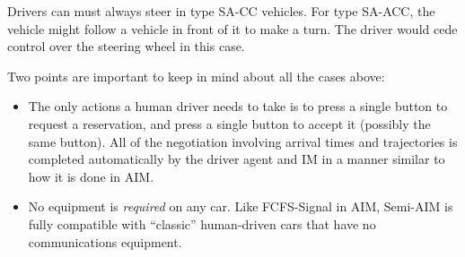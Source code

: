 Drivers can must always steer in type SA-CC vehicles. For type SA-ACC,
the vehicle might follow a vehicle in front of it to make a turn. The
driver would cede control over the steering wheel in this case.

Two points are important to keep in mind about all the cases above:
\begin{itemize}

\item The only actions a human driver needs to take is to press a
single button to request a reservation, and press a single button to
accept it (possibly the same button).  All of the negotiation
involving arrival times and trajectories is completed automatically by
the driver agent and IM in a manner similar to how it is done in AIM.

\item No equipment is \emph{required} on any car.  Like FCFS-Signal in
AIM, Semi-AIM is fully compatible with ``classic'' human-driven cars
that have no communications equipment.
\end{itemize}













